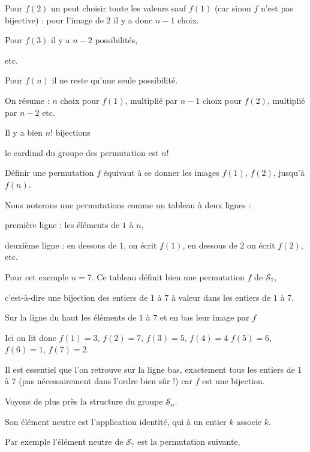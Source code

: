 Pour $f(2)$ un peut choisir toute les valeurs sauf $f(1)$ (car sinon $f$ n'est pas bijective) : 
pour l'image de $2$ il y a donc $n-1$ choix.

Pour $f(3)$ il y a $n-2$ possibilités,

etc.

Pour $f(n)$ il ne reste qu'une seule possibilité.

On résume : $n$ choix pour $f(1)$,
 multiplié par $n-1$ choix pour $f(2)$, multiplié par $n-2$ etc.

Il y a bien $n!$ bijections 

le cardinal du groupe des permutation est $n!$


\diapo

Définir une permutation $f$ équivaut à se donner les images
$f(1)$, $f(2)$, jusqu'à $f(n)$.

Nous noterons une permutations comme un tableau à deux lignes :

première ligne : les éléments de $1$ à $n$,

deuxième ligne : en dessous de $1$, on écrit $f(1)$, en dessous de $2$ on écrit $f(2)$, etc.

\change

Pour cet exemple $n=7$. 
Ce tableau définit bien une permutation $f$ de $\mathcal{S}_7$,

c'est-à-dire une bijection des entiers de $1$ à $7$ à valeur
dans les entiers de $1$ à $7$.

\change

Sur la ligne du haut les éléments de $1$ à $7$ et en bas leur image par $f$

\change

Ici on lit donc $f(1)=3$, $f(2)=7$, $f(3)=5$, $f(4)=4$
$f(5)=6$, $f(6)=1$, $f(7)=2$.

Il est essentiel que l'on retrouve sur la ligne bas, exactement tous les entiers de
$1$ à $7$ (pas nécessairement dans l'ordre bien sûr !) car $f$ est une bijection.



\diapo

Voyons de plus près la structure du groupe $\mathcal{S}_n$.

Son élément neutre est l'application identité, qui à un entier 
$k$ associe $k$.

Par exemple l'élément neutre de $\mathcal{S}_7$ est la permutation suivante,

